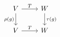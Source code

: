 \documentclass{article}
\begin{document}
    \begin{equation*}
        \begin{tikzcd}
            V \ar[r, "T"] \ar[d, "\rho\l(g\r)"'] & W \ar[d, "\tau\l(g\r)"] \\
            V \ar[r, "T"] & W
        \end{tikzcd}
    \end{equation*}
\end{document}
